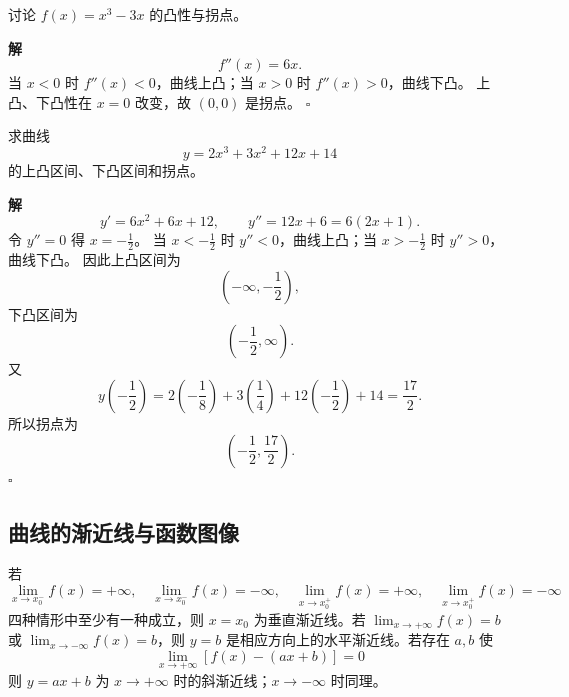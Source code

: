 \documentclass[fontset=fandol]{ctexart}
\newenvironment{solution}{\par\noindent\textbf{解}\quad}{\hfill$\square$\par\vspace{0.8em}}
\begin{document}
\begin{example}[凸性与拐点]
讨论 $f(x)=x^3-3x$ 的凸性与拐点。
\end{example}
\begin{solution}
\[
f''(x)=6x.
\]
当 $x<0$ 时 $f''(x)<0$，曲线上凸；当 $x>0$ 时 $f''(x)>0$，曲线下凸。 上凸、下凸性在 $x=0$ 改变，故 $(0,0)$ 是拐点。
\end{solution}

\begin{example}[凸性与拐点]
求曲线
\[
y=2x^3+3x^2+12x+14
\]
的上凸区间、下凸区间和拐点。
\end{example}
\begin{solution}
\[
y'=6x^2+6x+12,\qquad y''=12x+6=6(2x+1).
\]
令 $y''=0$ 得 $x=-\frac12$。 当 $x<-\frac12$ 时 $y''<0$，曲线上凸；当 $x>-\frac12$ 时 $y''>0$，曲线下凸。 因此上凸区间为
\[
\left(-\infty,-\frac12\right),
\]
下凸区间为
\[
\left(-\frac12,\infty\right).
\]
又
\[
y\left(-\frac12\right)=2\left(-\frac18\right)+3\left(\frac14\right)+12\left(-\frac12\right)+14
=\frac{17}{2}.
\]
所以拐点为
\[
\left(-\frac12,\frac{17}{2}\right).
\]
\end{solution}

\subsection{曲线的渐近线与函数图像}

\begin{definition}[渐近线]
若
\[
\lim_{x\to x_0^-}f(x)=+\infty,\quad
\lim_{x\to x_0^-}f(x)=-\infty,\quad
\lim_{x\to x_0^+}f(x)=+\infty,\quad
\lim_{x\to x_0^+}f(x)=-\infty
\]
四种情形中至少有一种成立，则 $x=x_0$ 为垂直渐近线。若 $\lim_{x\to+\infty}f(x)=b$ 或 $\lim_{x\to-\infty}f(x)=b$，则 $y=b$ 是相应方向上的水平渐近线。若存在 $a,b$ 使
\[
\lim_{x\to+\infty}[f(x)-(ax+b)]=0
\]
则 $y=ax+b$ 为 $x\to+\infty$ 时的斜渐近线；$x\to-\infty$ 时同理。
\end{definition}

\begin{center}
\end{center}
\end{document}
